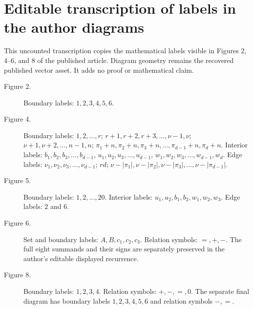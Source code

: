 \documentclass[10pt]{amsart}
\theoremstyle{definition}
\theoremstyle{plain}
\theoremstyle{plain}
\theoremstyle{definition}
\theoremstyle{remark}
\theoremstyle{plain}
\theoremstyle{plain}
\theoremstyle{plain}
\numberwithin{equation}{section}
\begin{document}
\section*{Editable transcription of labels in the author diagrams}
This uncounted transcription copies the mathematical labels visible in Figures 2, 4--6, and 8 of the published article. Diagram geometry remains the recovered published vector asset. It adds no proof or mathematical claim.
\begin{description}
\item[Figure 2.] Boundary labels: $1,2,3,4,5,6$.
\item[Figure 4.] Boundary labels: $1,2,\ldots,r$; $r+1,r+2,r+3,\ldots,\nu-1,\nu$; $\nu+1,\nu+2,\ldots,n-1,n$; $\pi_1+n,\pi_2+n,\pi_3+n,\ldots,\pi_{d-1}+n,\pi_d+n$. Interior labels: $b_1,b_2,b_3,\ldots,b_{d-1}$, $u_1,u_2,u_3,\ldots,u_{d-1}$, $w_1,w_2,w_3,\ldots,w_{d-1},w_d$. Edge labels: $\nu_1,\nu_2,\nu_3,\ldots,\nu_{d-1}$; $rd$; $\nu-|\pi_1|,\nu-|\pi_2|,\nu-|\pi_3|,\ldots,\nu-|\pi_{d-1}|$.
\item[Figure 5.] Boundary labels: $1,2,\ldots,20$. Interior labels: $u_1,u_2,b_1,b_2,w_1,w_2,w_3$. Edge labels: $2$ and $6$.
\item[Figure 6.] Set and boundary labels: $A,B,c_1,c_2,c_3$. Relation symbols: $=,+,-$. The full eight summands and their signs are separately preserved in the author's editable displayed recurrence.
\item[Figure 8.] Boundary labels: $1,2,3,4$. Relation symbols: $+,-,=,0$. The separate final diagram has boundary labels $1,2,3,4,5,6$ and relation symbols $-,=$.
\end{description}
\end{document}
